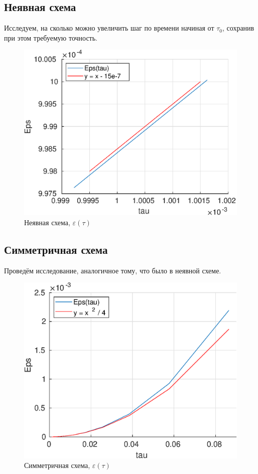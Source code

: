 \documentclass[12pt]{article}
\begin{document}
\newpage

\subsection{Неявная схема}
Исследуем, на сколько можно увеличить шаг по времени начиная от $\tau_0$, сохранив при этом требуемую точность.

\begin{figure}[H]
\centerline{\includegraphics[scale = 0.7]{epstau.eps}}
\caption{Неявная схема, $\varepsilon(\tau)$}
\end{figure} 


\subsection{Симметричная схема}
Проведём исследование, аналогичное тому, что было в неявной схеме.

\begin{figure}[H]
\centerline{\includegraphics[scale = 0.7]{epstausym.eps}}
\caption{Симметричная схема, $\varepsilon(\tau)$}
\end{figure} 
\end{document}
